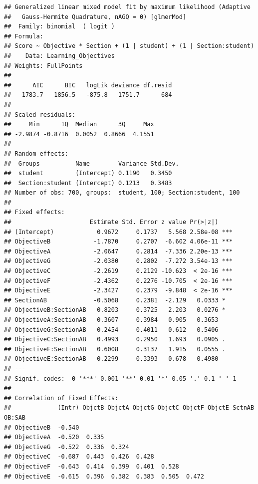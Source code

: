 \documentclass[12pt,nohyper]{tufte-handout}\usepackage[]{graphicx}\usepackage[]{color}
\makeatletter
\newenvironment{kframe}{%
 \def\at@end@of@kframe{}%
 \ifinner\ifhmode%
  \def\at@end@of@kframe{\end{minipage}}%
  \begin{minipage}{\columnwidth}%
 \fi\fi%
 \def\FrameCommand##1{\hskip\@totalleftmargin \hskip-\fboxsep
 \colorbox{shadecolor}{##1}\hskip-\fboxsep
     \hskip-\linewidth \hskip-\@totalleftmargin \hskip\columnwidth}%
 \MakeFramed {\advance\hsize-\width
   \@totalleftmargin\z@ \linewidth\hsize
   \@setminipage}}%
 {\par\unskip\endMakeFramed%
 \at@end@of@kframe}
\newenvironment{knitrout}{}{} %
\makeatother
\begin{document}
\begin{knitrout}
\color{fgcolor}\begin{kframe}
\begin{verbatim}
## Generalized linear mixed model fit by maximum likelihood (Adaptive
##   Gauss-Hermite Quadrature, nAGQ = 0) [glmerMod]
##  Family: binomial  ( logit )
## Formula: 
## Score ~ Objective * Section + (1 | student) + (1 | Section:student)
##    Data: Learning_Objectives
## Weights: FullPoints
## 
##      AIC      BIC   logLik deviance df.resid 
##   1783.7   1856.5   -875.8   1751.7      684 
## 
## Scaled residuals: 
##     Min      1Q  Median      3Q     Max 
## -2.9874 -0.8716  0.0052  0.8666  4.1551 
## 
## Random effects:
##  Groups          Name        Variance Std.Dev.
##  student         (Intercept) 0.1190   0.3450  
##  Section:student (Intercept) 0.1213   0.3483  
## Number of obs: 700, groups:  student, 100; Section:student, 100
## 
## Fixed effects:
##                      Estimate Std. Error z value Pr(>|z|)    
## (Intercept)            0.9672     0.1737   5.568 2.58e-08 ***
## ObjectiveB            -1.7870     0.2707  -6.602 4.06e-11 ***
## ObjectiveA            -2.0647     0.2814  -7.336 2.20e-13 ***
## ObjectiveG            -2.0380     0.2802  -7.272 3.54e-13 ***
## ObjectiveC            -2.2619     0.2129 -10.623  < 2e-16 ***
## ObjectiveF            -2.4362     0.2276 -10.705  < 2e-16 ***
## ObjectiveE            -2.3427     0.2379  -9.848  < 2e-16 ***
## SectionAB             -0.5068     0.2381  -2.129   0.0333 *  
## ObjectiveB:SectionAB   0.8203     0.3725   2.203   0.0276 *  
## ObjectiveA:SectionAB   0.3607     0.3984   0.905   0.3653    
## ObjectiveG:SectionAB   0.2454     0.4011   0.612   0.5406    
## ObjectiveC:SectionAB   0.4993     0.2950   1.693   0.0905 .  
## ObjectiveF:SectionAB   0.6008     0.3137   1.915   0.0555 .  
## ObjectiveE:SectionAB   0.2299     0.3393   0.678   0.4980    
## ---
## Signif. codes:  0 '***' 0.001 '**' 0.01 '*' 0.05 '.' 0.1 ' ' 1
## 
## Correlation of Fixed Effects:
##             (Intr) ObjctB ObjctA ObjctG ObjctC ObjctF ObjctE SctnAB OB:SAB
## ObjectiveB  -0.540                                                        
## ObjectiveA  -0.520  0.335                                                 
## ObjectiveG  -0.522  0.336  0.324                                          
## ObjectiveC  -0.687  0.443  0.426  0.428                                   
## ObjectiveF  -0.643  0.414  0.399  0.401  0.528                            
## ObjectiveE  -0.615  0.396  0.382  0.383  0.505  0.472                     

\end{verbatim}
\end{kframe}
\end{knitrout}
\end{document}
